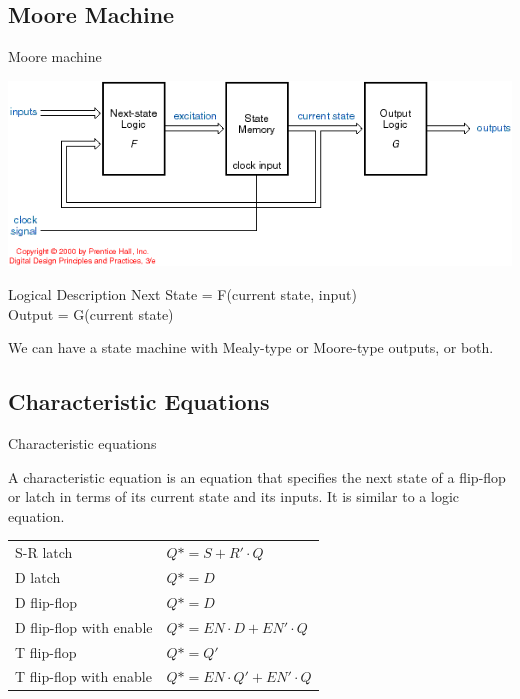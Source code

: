 \subsection{Moore Machine}

\begin{frame}{Moore machine}
  \begin{center}
    \includegraphics[scale=0.6]{MooreMachine}
  \end{center}
  \begin{block}{Logical Description}
    Next State = F(current state, input)\\
    Output = G(current state)
  \end{block}
  We can have a state machine with Mealy-type or Moore-type outputs, or both.
\end{frame}

\subsection{Characteristic Equations}

\begin{frame}{Characteristic equations}
  \begin{definition}
    A \alert{characteristic equation} is an equation that specifies the next state of a flip-flop or latch in terms of its current state and its inputs.  It is similar to a logic equation.
  \end{definition}
  \begin{center}
    \begin{tabular}{ll}
      S-R latch & $Q* = S + R' \cdot Q$ \\
      D latch & $Q* = D$ \\
      D flip-flop & $Q* = D$ \\
      D flip-flop with enable & $Q* = EN \cdot D + EN' \cdot Q$ \\
      T flip-flop & $Q* = Q'$ \\
      T flip-flop with enable & $Q* = EN \cdot Q' + EN' \cdot Q$ \\
    \end{tabular}
  \end{center}
\end{frame}

